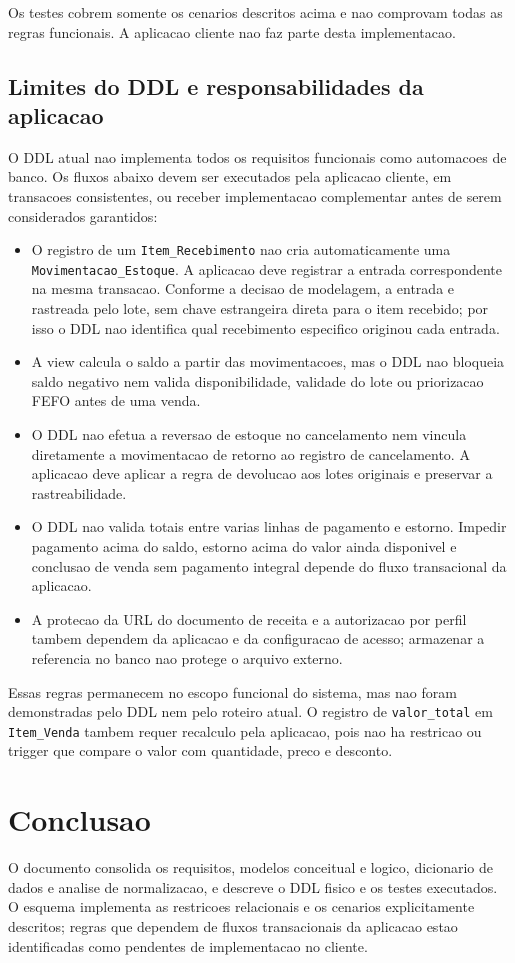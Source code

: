 \documentclass[12pt,a4paper]{article}
\begin{document}
Os testes cobrem somente os cenarios descritos acima e nao comprovam todas as regras funcionais. A aplicacao cliente nao faz parte desta implementacao.

\subsection{Limites do DDL e responsabilidades da aplicacao}
O DDL atual nao implementa todos os requisitos funcionais como automacoes de banco. Os fluxos abaixo devem ser executados pela aplicacao cliente, em transacoes consistentes, ou receber implementacao complementar antes de serem considerados garantidos:

\begin{itemize}
\item O registro de um \texttt{Item\_Recebimento} nao cria automaticamente uma \texttt{Movimentacao\_Estoque}. A aplicacao deve registrar a entrada correspondente na mesma transacao. Conforme a decisao de modelagem, a entrada e rastreada pelo lote, sem chave estrangeira direta para o item recebido; por isso o DDL nao identifica qual recebimento especifico originou cada entrada.
\item A view calcula o saldo a partir das movimentacoes, mas o DDL nao bloqueia saldo negativo nem valida disponibilidade, validade do lote ou priorizacao FEFO antes de uma venda.
\item O DDL nao efetua a reversao de estoque no cancelamento nem vincula diretamente a movimentacao de retorno ao registro de cancelamento. A aplicacao deve aplicar a regra de devolucao aos lotes originais e preservar a rastreabilidade.
\item O DDL nao valida totais entre varias linhas de pagamento e estorno. Impedir pagamento acima do saldo, estorno acima do valor ainda disponivel e conclusao de venda sem pagamento integral depende do fluxo transacional da aplicacao.
\item A protecao da URL do documento de receita e a autorizacao por perfil tambem dependem da aplicacao e da configuracao de acesso; armazenar a referencia no banco nao protege o arquivo externo.
\end{itemize}

Essas regras permanecem no escopo funcional do sistema, mas nao foram demonstradas pelo DDL nem pelo roteiro atual. O registro de \texttt{valor\_total} em \texttt{Item\_Venda} tambem requer recalculo pela aplicacao, pois nao ha restricao ou trigger que compare o valor com quantidade, preco e desconto.
\section{Conclusao}
O documento consolida os requisitos, modelos conceitual e logico, dicionario de dados e analise de normalizacao, e descreve o DDL fisico e os testes executados. O esquema implementa as restricoes relacionais e os cenarios explicitamente descritos; regras que dependem de fluxos transacionais da aplicacao estao identificadas como pendentes de implementacao no cliente.
\clearpage
\end{document}
